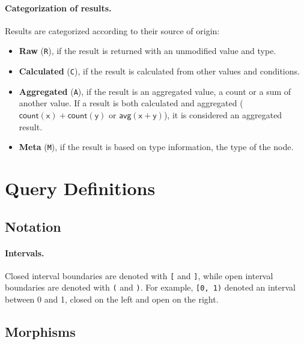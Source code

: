 \paragraph{Categorization of results.} Results are categorized according to their source of origin:

\begin{itemize}
	\item \textbf{Raw} (\texttt{R}), if the result is returned with an unmodified value and type.
	\item \textbf{Calculated} (\texttt{C}), if the result is calculated from other values and conditions.
	\item \textbf{Aggregated} (\texttt{A}), if the result is an aggregated value, \eg a count or a sum of another value. If a result is both calculated and aggregated (\eg $\mathsf{count(x) + count(y)}$ or $\mathsf{avg(x + y)}$), it is considered an aggregated result.
	\item \textbf{Meta} (\texttt{M}), if the result is based on type information, \eg the type of the node.
\end{itemize}



\section{Query Definitions}

\subsection{Notation}

\paragraph{Intervals.} Closed interval boundaries are denoted with \texttt{[} and \texttt{]}, while open interval boundaries are denoted with \texttt{(} and \texttt{)}. For example, \texttt{[0, 1)} denoted an interval between 0 and 1, closed on the left and open on the right.

\subsection{Morphisms}

